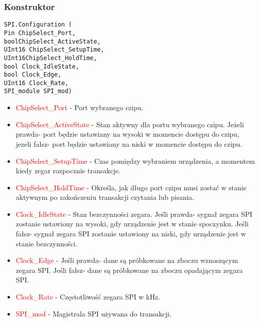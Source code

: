 \documentclass{article}
\begin{document}
\subsubsection{Konstruktor}
\begin{lstlisting}[frame=single]
SPI.Configuration (
Pin ChipSelect_Port, 
boolChipSelect_ActiveState,
UInt16 ChipSelect_SetupTime, 
UInt16ChipSelect_HoldTime,  
bool Clock_IdleState, 
bool Clock_Edge, 
UInt16 Clock_Rate, 
SPI_module SPI_mod)
\end{lstlisting}
\begin{itemize}
\item \textcolor{red}{ChipSelect\_Port} - Port wybranego czipu.
\item \textcolor{red}{ChipSelect\_ActiveState} - Stan aktywny dla portu wybranego czipu. Jeżeli prawda- port będzie ustawiany na wysoki w momencie dostępu do czipu, jezeli fałsz- port będzie ustawiany na niski w momencie dostępu do czipu.
\item \textcolor{red}{ChipSelect\_SetupTime} - Czas pomiędzy wybraniem urządzenia, a momentem kiedy zegar rozpocznie transakcje. 
\item \textcolor{red}{ChipSelect\_HoldTime} - Określa, jak długo port czipu musi zostać w stanie aktywnym po zakończeniu transakcji czytania lub pisania.
\item \textcolor{red}{Clock\_IdleState} - Stan bezczynności zegara. Jeśli prawda- sygnał zegara SPI zostanie ustawiony na wysoki, gdy urządzenie jest w stanie spoczynku. Jeśli fałsz- sygnał zegara SPI zostanie ustawiony na niski, gdy urządzenie jest w stanie bezczynności. 
\item \textcolor{red}{Clock\_Edge} - Jeśli prawda- dane są próbkowane na zboczu wznoszącym zegara SPI. Jeśli fałsz- dane są próbkowane na zboczu opadającym zegara SPI.
\item \textcolor{red}{Clock\_Rate} - Częstotliwość zegara SPI w kHz.
\item \textcolor{red}{SPI\_mod} - Magistrala SPI używana do transakcji.
\end{itemize}
\newpage
\end{document}
